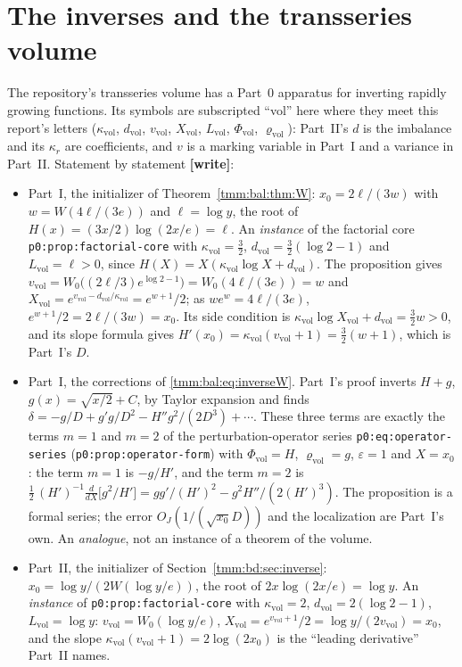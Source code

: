 \documentclass[11pt,letterpaper]{article}
\theoremstyle{remark}\newtheorem{remark}[theorem]{Remark}
\newcommand{\file}[1]{\nolinkurl{#1}}
\newcommand{\wtag}{\textup{\textbf{[write]}}}
\newcommand{\vol}{\mathrm{vol}}
\begin{document}
\section*{The inverses and the transseries volume}\label{tmm:sec:inverses}
The repository's transseries volume \cite{TSvol} has a Part~0 apparatus for inverting rapidly growing functions. Its symbols are subscripted ``vol'' here where they meet this report's letters ($\kappa_\vol$, $d_\vol$, $v_\vol$, $X_\vol$, $L_\vol$, $\Phi_\vol$, $\varrho_\vol$): Part~II's $d$ is the imbalance and its $\kappa_r$ are coefficients, and $v$ is a marking variable in Part~I and a variance in Part~II. Statement by statement \wtag:
\begin{itemize}
\item Part~I, the initializer of Theorem~\ref{tmm:bal:thm:W}: $x_0=2\ell/(3w)$ with $w=W(4\ell/(3e))$ and $\ell=\log y$, the root of $H(x)=(3x/2)\log(2x/e)=\ell$. An \emph{instance} of the factorial core \file{p0:prop:factorial-core} with $\kappa_\vol=\frac32$, $d_\vol=\frac32(\log2-1)$ and $L_\vol=\ell>0$, since $H(X)=X(\kappa_\vol\log X+d_\vol)$. The proposition gives $v_\vol=W_0\bigl((2\ell/3)e^{\log2-1}\bigr)=W_0(4\ell/(3e))=w$ and $X_\vol=e^{v_\vol-d_\vol/\kappa_\vol}=e^{w+1}/2$; as $we^w=4\ell/(3e)$, $e^{w+1}/2=2\ell/(3w)=x_0$. Its side condition is $\kappa_\vol\log X_\vol+d_\vol=\frac32w>0$, and its slope formula gives $H'(x_0)=\kappa_\vol(v_\vol+1)=\frac32(w+1)$, which is Part~I's $D$.
\item Part~I, the corrections of \eqref{tmm:bal:eq:inverseW}. Part~I's proof inverts $H+g$, $g(x)=\sqrt{x/2}+C$, by Taylor expansion and finds $\delta=-g/D+g'g/D^2-H''g^2/(2D^3)+\cdots$. These three terms are exactly the terms $m=1$ and $m=2$ of the perturbation-operator series \file{p0:eq:operator-series} (\file{p0:prop:operator-form}) with $\Phi_\vol=H$, $\varrho_\vol=g$, $\varepsilon=1$ and $X=x_0$: the term $m=1$ is $-g/H'$, and the term $m=2$ is $\frac12\,(H')^{-1}\frac{d}{dX}\bigl[g^2/H'\bigr]=gg'/(H')^2-g^2H''/(2(H')^3)$. The proposition is a formal series; the error $O_J(1/(\sqrt{x_0}D))$ and the localization are Part~I's own. An \emph{analogue}, not an instance of a theorem of the volume.
\item Part~II, the initializer of Section~\ref{tmm:bd:sec:inverse}: $x_0=\log y/(2W(\log y/e))$, the root of $2x\log(2x/e)=\log y$. An \emph{instance} of \file{p0:prop:factorial-core} with $\kappa_\vol=2$, $d_\vol=2(\log2-1)$, $L_\vol=\log y$: $v_\vol=W_0(\log y/e)$, $X_\vol=e^{v_\vol+1}/2=\log y/(2v_\vol)=x_0$, and the slope $\kappa_\vol(v_\vol+1)=2\log(2x_0)$ is the ``leading derivative'' Part~II names.

\end{itemize}
\end{document}
